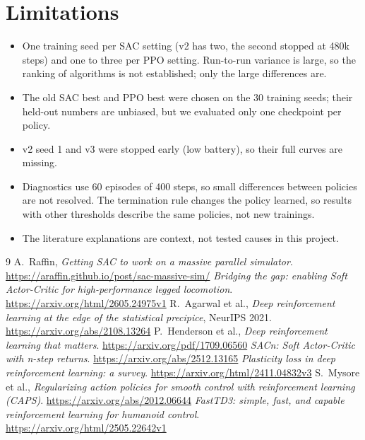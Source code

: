 \documentclass[11pt,a4paper]{article}
\begin{document}
\section{Limitations}
\begin{itemize}
\item One training seed per SAC setting (v2 has two, the second stopped at 480k steps) and one to three per PPO setting. Run-to-run variance is large, so the ranking of algorithms is not established; only the large differences are.
\item The old SAC best and PPO best were chosen on the 30 training seeds; their held-out numbers are unbiased, but we evaluated only one checkpoint per policy.
\item v2 seed 1 and v3 were stopped early (low battery), so their full curves are missing.
\item Diagnostics use 60 episodes of 400 steps, so small differences between policies are not resolved. The termination rule changes the policy learned, so results with other thresholds describe the same policies, not new trainings.
\item The literature explanations are context, not tested causes in this project.
\end{itemize}

\begin{thebibliography}{9}\small
{} A.~Raffin, \emph{Getting SAC to work on a massive parallel simulator}. \url{https://araffin.github.io/post/sac-massive-sim/}
 \emph{Bridging the gap: enabling Soft Actor-Critic for high-performance legged locomotion}. \url{https://arxiv.org/html/2605.24975v1}
 R.~Agarwal et al., \emph{Deep reinforcement learning at the edge of the statistical precipice}, NeurIPS 2021. \url{https://arxiv.org/abs/2108.13264}
 P.~Henderson et al., \emph{Deep reinforcement learning that matters}. \url{https://arxiv.org/pdf/1709.06560}
 \emph{SACn: Soft Actor-Critic with n-step returns}. \url{https://arxiv.org/abs/2512.13165}
 \emph{Plasticity loss in deep reinforcement learning: a survey}. \url{https://arxiv.org/html/2411.04832v3}
 S.~Mysore et al., \emph{Regularizing action policies for smooth control with reinforcement learning (CAPS)}. \url{https://arxiv.org/abs/2012.06644}
 \emph{FastTD3: simple, fast, and capable reinforcement learning for humanoid control}. \url{https://arxiv.org/html/2505.22642v1}
\end{thebibliography}
\end{document}
